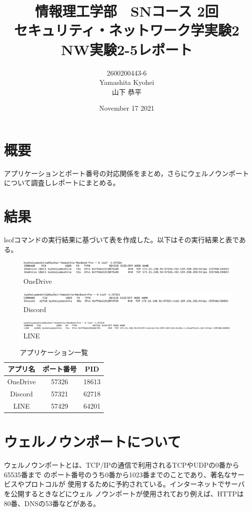\documentclass[dvipdfmx,autodetect-engine,titlepage]{jsarticle}
\title{情報理工学部　SNコース 2回\\
セキュリティ・ネットワーク学実験2\\
NW実験2-5レポート}
\author{2600200443-6\\Yamashita Kyohei\\山下 恭平}
\date{November 17 2021}
\begin{document}
\maketitle

\section{概要}
アプリケーションとポート番号の対応関係をまとめ，さらにウェルノウンポート
について調査しレポートにまとめる。

\section{結果}
lsofコマンドの実行結果に基づいて表を作成した。以下はその実行結果と表である。

\begin{figure}[h]
  \centering
  \caption{OneDrive}
  \includegraphics[scale=0.5]{SS1.png}
\end{figure}

\begin{figure}[h]
  \centering
  \caption{Discord}
  \includegraphics[scale=0.5]{SS2.png}
\end{figure}

\begin{figure}[h]
  \centering
  \caption{LINE}
  \includegraphics[scale=0.45]{SS3.png}
\end{figure}

\begin{table}[h]
  \centering
  \begin{tabular}{|c|c|c|}
  \hline
  アプリ名     & ポート番号 & PID   \\ \hline \hline
  OneDrive & 57326 & 18613 \\ \hline
  Discord  & 57321 & 62718 \\ \hline
  LINE     & 57429 & 64201 \\ \hline
  \end{tabular}
  \caption{アプリケーション一覧}
  \end{table}

\section{ウェルノウンポートについて}
ウェルノウンポートとは、TCP/IPの通信で利用されるTCPやUDPの0番から65535番まで
のポート番号のうち0番から1023番までのことであり、著名なサービスやプロトコルが
使用するために予約されている。インターネットでサーバを公開するときなどにウェル
ノウンポートが使用されており例えば、HTTPは80番、DNSの53番などがある。
\end{document}
